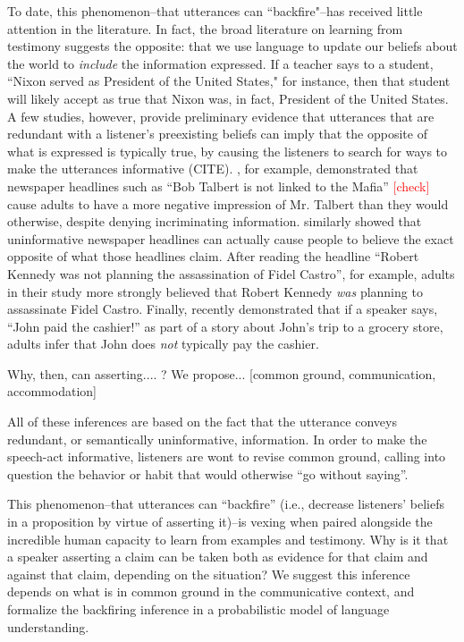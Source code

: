 \documentclass[10pt,letterpaper]{article}
\newcommand{\red}[1]{\textcolor{Red}{#1}}
\begin{document}
To date, this phenomenon--that utterances can ``backfire"--has received little attention in the literature.  In fact, the broad literature on learning from testimony  suggests the opposite: that we use language to update our beliefs about the world to \emph{include} the information expressed.  If a teacher says to a student, ``Nixon served as President of the United States," for instance, then that student will likely accept as true that Nixon was, in fact, President of the United States.  A few studies, however, provide preliminary evidence that utterances that are redundant with a listener's preexisting beliefs can imply that the opposite of what is expressed is typically true, by causing the listeners to search for ways to make the utterances informative (CITE).  , for example, demonstrated that newspaper headlines such as ``Bob Talbert is not linked to the Mafia'' \red{[check]} cause adults to have a more negative impression of Mr. Talbert than they would otherwise, despite denying incriminating information.   similarly showed that uninformative newspaper headlines can actually cause people to believe the exact opposite of what those headlines claim.  
After reading the headline ``Robert Kennedy was not planning the assassination of Fidel Castro'', for example, adults in their study more strongly believed that Robert Kennedy \emph{was} planning to assassinate Fidel Castro.  Finally,  recently demonstrated that if a speaker says, ``John paid the cashier!'' as part of a story about John's trip to a grocery store, adults infer that John does \emph{not} typically pay the cashier.

Why, then, can asserting.... ?  We propose... [common ground, communication, accommodation]
 
All of these inferences are based on the fact that the utterance conveys redundant, or semantically uninformative, information.
In order to make the speech-act informative, listeners are wont to revise common ground, calling into question the behavior or habit that would otherwise ``go without saying''.




This phenomenon--that utterances can ``backfire'' (i.e., decrease listeners' beliefs in a proposition by virtue of asserting it)--is vexing when paired alongside the incredible human capacity to learn from examples and testimony. 
Why is it that a speaker asserting a claim can be taken both as evidence for that claim and against that claim, depending on the situation? 
We suggest this inference depends on what is in common ground in the communicative context, and formalize the backfiring inference in a probabilistic model of language understanding.
\end{document}
